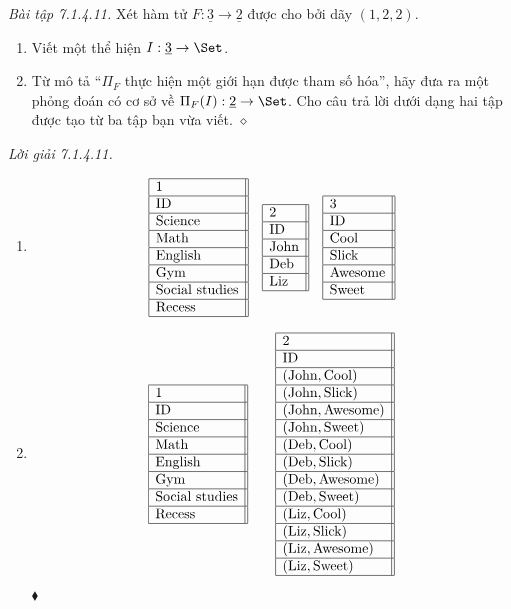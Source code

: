 \noindent\textit{Bài tập 7.1.4.11.}\keepwithnext
Xét hàm tử $F:\underline3\to\underline2$ được cho bởi dãy $(1,2,2)$.
\begin{enumerate}[label=\alph*.]
\item Viết một thể hiện $I:\underline3\to\Set$.
\item Từ mô tả ``$\Pi_F$ thực hiện một giới hạn được tham số hóa'', hãy đưa ra một phỏng đoán có cơ sở về $\Pi_F(I):\underline2\to\Set$. Cho câu trả lời dưới dạng hai tập được tạo từ ba tập bạn vừa viết.
\nobreak\hfill$\diamond$
\end{enumerate}

\noindent\begin{minipage}{\linewidth}
\textit{Lời giải 7.1.4.11.}
\begin{enumerate}[label=\alph*.]
\item
\[
\begin{array}{|l||}\hline1\\\hline\text{ID}\\\hline\text{Science}\\\hline\text{Math}\\\hline\text{English}\\\hline\text{Gym}\\\hline\text{Social studies}\\\hline\text{Recess}\\\hline\end{array}\quad
\begin{array}{|l||}\hline2\\\hline\text{ID}\\\hline\text{John}\\\hline\text{Deb}\\\hline\text{Liz}\\\hline\end{array}\quad
\begin{array}{|l||}\hline3\\\hline\text{ID}\\\hline\text{Cool}\\\hline\text{Slick}\\\hline\text{Awesome}\\\hline\text{Sweet}\\\hline\end{array}
\]
\item
\[
\begin{array}{|l||}\hline1\\\hline\text{ID}\\\hline\text{Science}\\\hline\text{Math}\\\hline\text{English}\\\hline\text{Gym}\\\hline\text{Social studies}\\\hline\text{Recess}\\\hline\end{array}\qquad
\begin{array}{|l||}\hline2\\\hline\text{ID}\\\hline
(\text{John},\text{Cool})\\\hline(\text{John},\text{Slick})\\\hline
(\text{John},\text{Awesome})\\\hline(\text{John},\text{Sweet})\\\hline
(\text{Deb},\text{Cool})\\\hline(\text{Deb},\text{Slick})\\\hline
(\text{Deb},\text{Awesome})\\\hline(\text{Deb},\text{Sweet})\\\hline
(\text{Liz},\text{Cool})\\\hline(\text{Liz},\text{Slick})\\\hline
(\text{Liz},\text{Awesome})\\\hline(\text{Liz},\text{Sweet})\\\hline\end{array}
\]
\nobreak\hfill$\blacklozenge$
\end{enumerate}
\end{minipage}\par
